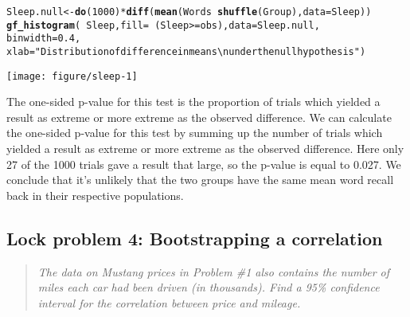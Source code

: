 \documentclass[11pt]{article}\usepackage[]{graphicx}\usepackage[]{color}
\makeatletter
\def\maxwidth{ %
  \ifdim\Gin@nat@width>\linewidth
    \linewidth
  \else
    \Gin@nat@width
  \fi
}
\newcommand{\hlnum}[1]{\textcolor[rgb]{0.686,0.059,0.569}{#1}}%
\newcommand{\hlstr}[1]{\textcolor[rgb]{0.192,0.494,0.8}{#1}}%
\newcommand{\hlopt}[1]{\textcolor[rgb]{0,0,0}{#1}}%
\newcommand{\hlstd}[1]{\textcolor[rgb]{0.345,0.345,0.345}{#1}}%
\newcommand{\hlkwb}[1]{\textcolor[rgb]{0.69,0.353,0.396}{#1}}%
\newcommand{\hlkwc}[1]{\textcolor[rgb]{0.333,0.667,0.333}{#1}}%
\newcommand{\hlkwd}[1]{\textcolor[rgb]{0.737,0.353,0.396}{\textbf{#1}}}%
\newenvironment{kframe}{%
 \def\at@end@of@kframe{}%
 \ifinner\ifhmode%
  \def\at@end@of@kframe{\end{minipage}}%
  \begin{minipage}{\columnwidth}%
 \fi\fi%
 \def\FrameCommand##1{\hskip\@totalleftmargin \hskip-\fboxsep
 \colorbox{shadecolor}{##1}\hskip-\fboxsep
     \hskip-\linewidth \hskip-\@totalleftmargin \hskip\columnwidth}%
 \MakeFramed {\advance\hsize-\width
   \@totalleftmargin\z@ \linewidth\hsize
   \@setminipage}}%
 {\par\unskip\endMakeFramed%
 \at@end@of@kframe}
\newenvironment{knitrout}{}{} %
\makeatother
\begin{document}
\begin{knitrout}
\color{fgcolor}\begin{kframe}
\begin{alltt}
\hlstd{Sleep.null} \hlkwb{<-} \hlkwd{do}\hlstd{(}\hlnum{1000}\hlstd{)} \hlopt{*} \hlkwd{diff}\hlstd{(}\hlkwd{mean}\hlstd{(Words} \hlopt{~} \hlkwd{shuffle}\hlstd{(Group),} \hlkwc{data} \hlstd{= Sleep))}
\hlkwd{gf_histogram}\hlstd{(}\hlopt{~} \hlstd{Sleep,} \hlkwc{fill} \hlstd{=} \hlopt{~} \hlstd{(Sleep} \hlopt{>=} \hlstd{obs),} \hlkwc{data} \hlstd{= Sleep.null,}
  \hlkwc{binwidth} \hlstd{=} \hlnum{0.4}\hlstd{,}
  \hlkwc{xlab} \hlstd{=} \hlstr{"Distribution of difference in means\textbackslash{}nunder the null hypothesis"}\hlstd{)}
\end{alltt}
\end{kframe}

{\centering \texttt{[image: figure/sleep-1]} 

}



\end{knitrout}

The one-sided p-value for this test is the proportion of  
trials which yielded a result as extreme or more extreme as the observed difference.
We can calculate the one-sided p-value for this test by summing up the number of 
trials which yielded a result as extreme or more extreme as the observed difference.
Here only 27 of the 1000 trials gave a result that large, so the p-value is equal to 0.027.  We conclude that
it's unlikely that the two groups have the same mean word recall back in their respective populations.


\subsection*{Lock problem 4: Bootstrapping a correlation}

\begin{quotation}
{\em The data on Mustang prices in Problem \#1 also contains the number
 of miles each car had been driven (in thousands).  Find a
 95\% confidence interval for the correlation between price and mileage.}
\end{quotation}
\end{document}
